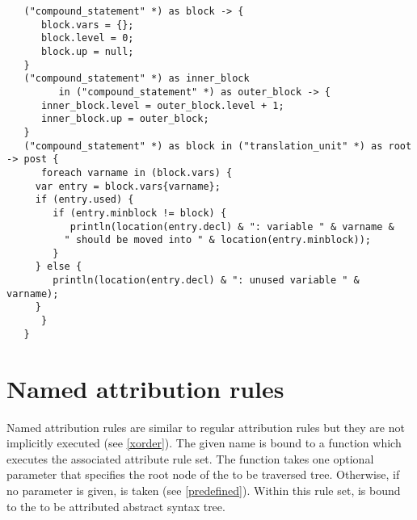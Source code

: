 \begin{lstlisting}
   ("compound_statement" *) as block -> {
      block.vars = {};
      block.level = 0;
      block.up = null;
   }
   ("compound_statement" *) as inner_block
         in ("compound_statement" *) as outer_block -> {
      inner_block.level = outer_block.level + 1;
      inner_block.up = outer_block;
   }
   ("compound_statement" *) as block in ("translation_unit" *) as root -> post {
      foreach varname in (block.vars) {
	 var entry = block.vars{varname};
	 if (entry.used) {
	    if (entry.minblock != block) {
	       println(location(entry.decl) & ": variable " & varname &
		  " should be moved into " & location(entry.minblock));
	    }
	 } else {
	    println(location(entry.decl) & ": unused variable " & varname);
	 }
      }
   }
\end{lstlisting}

\section{Named attribution rules}\label{named-atrules}

Named attribution rules are similar to regular attribution rules but
they are not implicitly executed (see \ref{xorder}). The given name
is bound to a function which executes the associated attribute rule
set. The function takes one optional parameter that specifies the
root node of the to be traversed tree. Otherwise, if no parameter is
given,  is taken (see \ref{predefined}).
Within this rule set,  is bound to the
to be attributed abstract syntax tree.

\begin{grammar}
      \produces {} 
	 \lextoken{\{} 
	 \lextoken{\}}
\end{grammar}

\endinput
